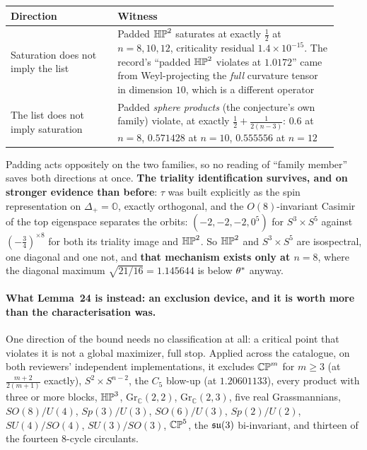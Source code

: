 \begin{center}
\begin{tabular}{@{}p{0.30\linewidth}p{0.62\linewidth}@{}}
\toprule
\textbf{Direction} & \textbf{Witness} \\
\midrule
Saturation does not imply the list & Padded $\mathbb{HP}^2$ saturates at exactly $\tfrac12$ at $n=8,10,12$, criticality residual $1.4\times10^{-15}$. The record's ``padded $\mathbb{HP}^2$ violates at $1.0172$'' came from Weyl-projecting the \emph{full} curvature tensor in dimension $10$, which is a different operator \\
\addlinespace
The list does not imply saturation & Padded \emph{sphere products} (the conjecture's own family) violate, at exactly $\tfrac12+\tfrac1{2(n-3)}$: $0.6$ at $n=8$, $0.571428$ at $n=10$, $0.555556$ at $n=12$ \\
\bottomrule
\end{tabular}
\end{center}

Padding acts oppositely on the two families, so no reading of ``family member'' saves both directions at once. \textbf{The triality identification survives, and on stronger evidence than before}: $\tau$ was built explicitly as the spin representation on $\Delta_+=\mathbb O$, exactly orthogonal, and the $O(8)$-invariant Casimir of the top eigenspace separates the orbits: $(-2,-2,-2,0^5)$ for $S^3\times S^5$ against $(-\tfrac34)^{\times8}$ for both its triality image and $\mathbb{HP}^2$. So $\mathbb{HP}^2$ and $S^3\times S^5$ are isospectral, one diagonal and one not, and \textbf{that mechanism exists only at $n=8$}, where the diagonal maximum $\sqrt{21/16}=1.145644$ is below $\theta^{*}$ anyway.

\paragraph{What Lemma~24 is instead: an exclusion device, and it is worth more than the characterisation was.} One direction of the bound needs no classification at all: a critical point that violates it is not a global maximizer, full stop. Applied across the catalogue, on both reviewers' independent implementations, it excludes $\mathbb{CP}^m$ for $m\ge3$ (at $\tfrac{m+2}{2(m+1)}$ exactly), $S^2\times S^{n-2}$, the $C_5$ blow-up (at $1.20601133$), every product with three or more blocks, $\mathbb{HP}^3$, $\mathrm{Gr}_{\mathbb C}(2,2)$, $\mathrm{Gr}_{\mathbb C}(2,3)$, five real Grassmannians, $SO(8)/U(4)$, $Sp(3)/U(3)$, $SO(6)/U(3)$, $Sp(2)/U(2)$, $SU(4)/SO(4)$, $SU(3)/SO(3)$, $\mathbb{CP}^5$, the $\mathfrak{su}(3)$ bi-invariant, and thirteen of the fourteen $8$-cycle circulants.

